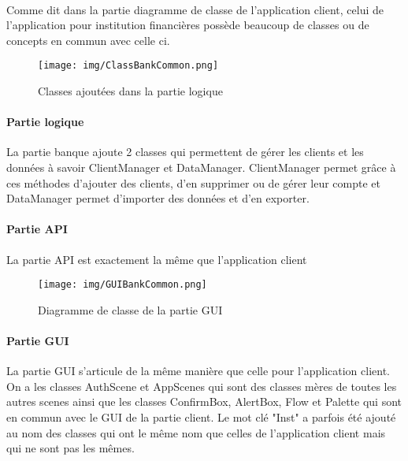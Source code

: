 \documentclass[]{article}
\begin{document}
\paragraph{}Comme dit dans la partie diagramme de classe de l’application client, celui de l’application pour institution financières possède beaucoup de classes ou de concepts en commun avec celle ci.


\begin{figure}[ht]
\centering
\texttt{[image: img/ClassBankCommon.png]}
\caption{Classes ajoutées dans la partie logique}
\label{fig1}
\end{figure}

\paragraph{Partie logique}La partie banque ajoute 2 classes qui permettent de gérer les clients et les données à savoir ClientManager et DataManager. ClientManager permet grâce à ces méthodes d’ajouter des clients, d’en supprimer ou de gérer leur compte et DataManager permet d’importer des données et d’en exporter.

\paragraph{Partie API} La partie API est exactement la même que l'application client

\begin{figure}[ht]
\centering
\texttt{[image: img/GUIBankCommon.png]}
\caption{Diagramme de classe de la partie GUI }
\label{fig2}
\end{figure}

\paragraph*{Partie GUI} La partie GUI s’articule de la même manière que celle pour l’application client. On a les classes AuthScene et AppScenes qui sont des classes mères de toutes les autres scenes ainsi que les classes ConfirmBox, AlertBox, Flow et Palette qui sont en commun avec le GUI de la partie client. Le mot clé "Inst" a parfois été ajouté au nom des classes qui ont le même nom que celles de l'application client mais qui ne sont pas les mêmes.
\end{document}
